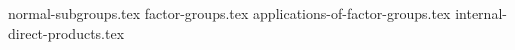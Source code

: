\setcounter{chapter}{9}
\setcounter{section}{0}
{normal-subgroups.tex}
{factor-groups.tex}
{applications-of-factor-groups.tex}
{internal-direct-products.tex}
